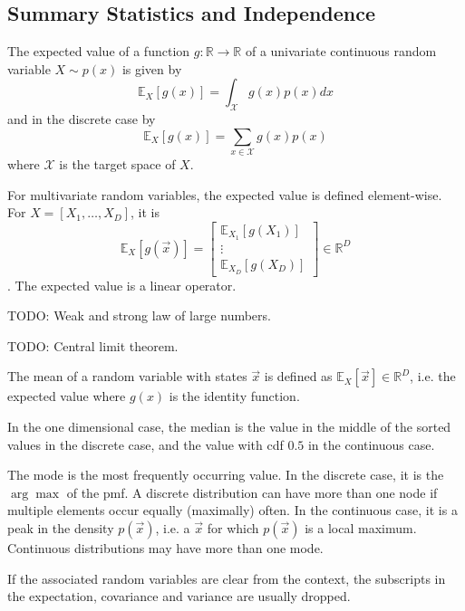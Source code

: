 \subsection{Summary Statistics and Independence}
The expected value of a function $g: \mathbb{R} \to \mathbb{R}$
of a univariate continuous random variable $X \sim p(x)$ is
given by
\begin{equation*}
    \mathbb{E}_X[g(x)] = \int_\mathcal{X}{g(x) p(x) dx}
\end{equation*}
and in the discrete case by
\begin{equation*}
    \mathbb{E}_X[g(x)] = \sum_{x \in \mathcal{X}}{g(x) p(x)}
\end{equation*}
where $\mathcal{X}$ is the target space of $X$.

For multivariate random variables, the expected value is defined
element-wise. For $X = [X_1, \dotsc, X_D]$, it is
\begin{equation*}
    \mathbb{E}_X[g(\vec{x})] =
    \begin{bmatrix}
        \mathbb{E}_{X_1}[g(X_1)] \\
        \vdots \\
        \mathbb{E}_{X_D}[g(X_D)]
    \end{bmatrix}
    \in \mathbb{R}^D
\end{equation*}.
The expected value is a linear operator.

TODO: Weak and strong law of large numbers.

TODO: Central limit theorem.

The mean of a random variable with states $\vec{x}$ is defined as
$\mathbb{E}_X[\vec{x}] \in \mathbb{R}^D$,
i.e. the expected value where $g(x)$ is the identity function.

In the one dimensional case,
the median is the value in the middle of the sorted values in the
discrete case, and the value with cdf $0.5$ in the continuous case.

The mode is the most frequently occurring value.
In the discrete case, it is the $\arg\max$ of the pmf.
A discrete distribution can have more than one node if
multiple elements occur equally (maximally) often.
In the continuous case, it is a peak in the density $p(\vec{x})$,
i.e. a $\vec{x}$ for which $p(\vec{x})$ is a local maximum.
Continuous distributions may have more than one mode.

If the associated random variables are clear from the
context, the subscripts in the expectation,
covariance and variance are usually dropped.

